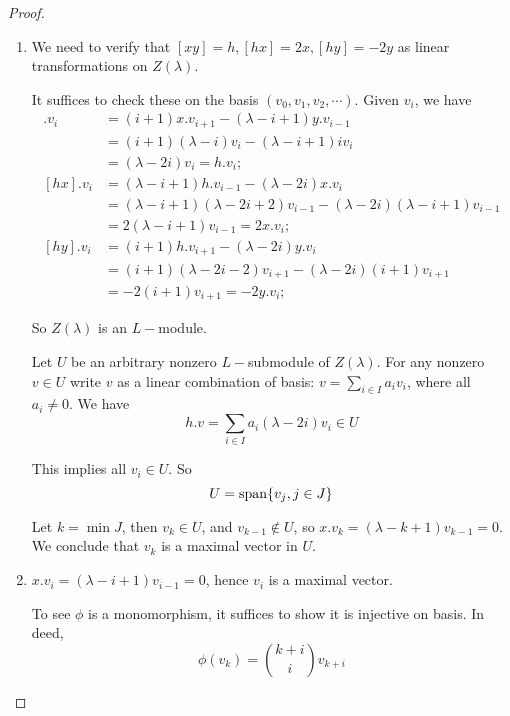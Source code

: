 \begin{proof}
  \begin{enumerate}
    \item We need to verify that $[xy]=h, [hx]=2x, [hy]=-2y$ as linear transformations on $Z(\lambda)$.

    It suffices to check these on the basis $(v_0,v_1,v_2,\cdots)$. Given $v_i$, we have
    \begin{align*}
      [xy].v_i & = (i+1)x.v_{i+1}-(\lambda-i+1)y.v_{i-1} \\
                   & = (i+1)(\lambda-i)v_i -(\lambda-i+1)iv_i \\
                   & = (\lambda-2i)v_i = h.v_i; \\
      [hx].v_i & = (\lambda-i+1)h.v_{i-1}-(\lambda-2i)x.v_i \\
                   & = (\lambda-i+1)(\lambda-2i+2)v_{i-1} -(\lambda-2i)(\lambda-i+1)v_{i-1} \\
                   & = 2(\lambda-i+1)v_{i-1} = 2x.v_i; \\
      [hy].v_i & = (i+1)h.v_{i+1}-(\lambda-2i)y.v_i \\
                   & = (i+1)(\lambda-2i-2)v_{i+1} -(\lambda-2i)(i+1)v_{i+1} \\
                   & = -2(i+1)v_{i+1} = -2y.v_i;
    \end{align*}

    So $Z(\lambda)$ is an $L-$module.

    Let $U$ be an arbitrary nonzero $L-$submodule of $Z(\lambda)$. For any nonzero $v\in U$ write $v$ as a linear combination of basis: $v=\sum\limits_{i\in I}a_iv_i$, where all $a_i\neq0$. We have
    \begin{equation*}
      h.v=\sum_{i\in I} a_i(\lambda-2i)v_i \in U
    \end{equation*}

    This implies all $v_i\in U$. So
    \begin{equation*}
      U=\operatorname{span}\{v_j,j\in J\}
    \end{equation*}

    Let $k = \min J$, then $v_k \in U$, and $v_{k-1} \not\in U$, so $x.v_k = (\lambda - k + 1)v_{k-1} = 0$. We conclude that $v_k$ is a maximal vector in $U$.
    \item $x.v_i=(\lambda-i+1)v_{i-1}=0$, hence $v_i$ is a maximal vector.

    To see $\phi$ is a monomorphism, it suffices to show it is injective on basis. In deed,
    \begin{equation*}
      \phi(v_k)=\binom{k+i}{i}v_{k+i}
    \end{equation*}


\end{enumerate}
\end{proof}
